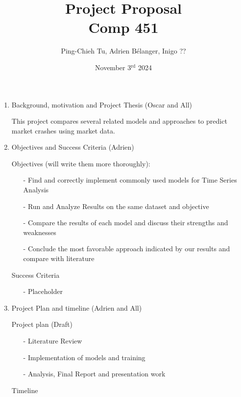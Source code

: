 \documentclass[12pt, letterpaper]{article}
\title{
  Project Proposal \\
  \Large Comp 451}
\author{Ping-Chieh Tu, Adrien Bélanger, Inigo ??}
\date{November 3$^{\text{rd}}$ 2024}
\begin{document}
\maketitle 

\begin{enumerate}
    \item Background, motivation and Project Thesis (Oscar and All)
    
    This project compares several related models and approaches to predict market crashes using market data.
    
    \item Objectives and Success Criteria (Adrien)
    
        Objectives (will write them more thoroughly):
        \begin{itemize}
            \item[-] Find and correctly implement commonly used models for Time Series Analysis
            \item[-] Run and Analyze Results on the same dataset and objective
            \item[-] Compare the results of each model and discuss their strengths and weaknesses
            \item[-] Conclude the most favorable approach indicated by our results and compare with literature
        \end{itemize} 
        Success Criteria
        \begin{itemize}
            \item [-] Placeholder
        \end{itemize}
        
    \item Project Plan and timeline (Adrien and All)
        
        Project plan (Draft)
        \begin{itemize}
            \item [-] Literature Review
            \item [-] Implementation of models and training
            \item [-] Analysis, Final Report and presentation work
        \end{itemize}
    
        Timeline
        
\end{enumerate}
\end{document}
